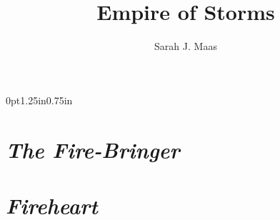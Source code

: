 \documentclass[12pt, openany]{book}
\title{Empire of Storms}
\author{Sarah J. Maas}
\date{}
\begin{document}


\blankpage

\blankpage




\tableofcontents

\newpage


\newpage %
\pdfpagewidth=5.5in \pdfpageheight=8.25in \eject %
\titlespacing*{\chapter} {0pt}{1.25in}{0.75in} %



\part{\emph{The Fire-Bringer}}








































\part{\emph{Fireheart}}







































\end{document}
